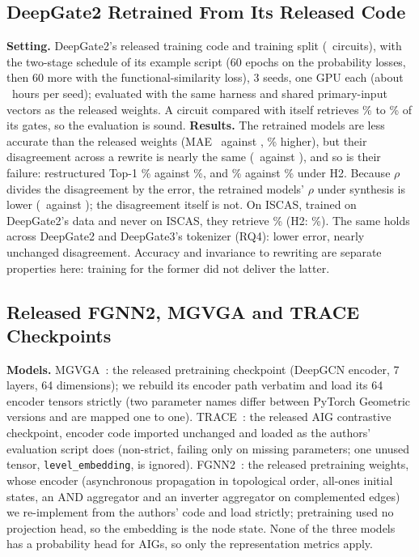 \subsection{DeepGate2 Retrained From Its Released Code}\label{app:dg2retrain}
\noindent\textbf{Setting.} DeepGate2's released training code and training split (\TenNTrain\ circuits), with the two-stage
schedule of its example script (60 epochs on the probability losses, then 60 more with the functional-similarity loss),
3 seeds, one GPU each (about \TenHours\ hours per seed); evaluated with the same harness and shared primary-input
vectors as the released weights. A circuit compared with itself retrieves \TenSelfMin\% to \TenSelfMax\% of its gates, so the
evaluation is sound. \textbf{Results.} The retrained models are less accurate than the released weights (MAE \TenMAE\ against
\TenRelMAE, \TenMaePct\% higher), but their disagreement across a rewrite is nearly the same (\TenIncons\ against \TenRelIncons),
and so is their failure: restructured Top-1 \TenTop\% against \TenRelTop\%, and \TenHTwo\% against \TenRelHTwo\% under H2. Because
$\rho$ divides the disagreement by the error, the retrained models' $\rho$ under synthesis is lower (\TenRho\ against \TenRelRho);
the disagreement itself is not. On ISCAS, trained on DeepGate2's data and never on ISCAS, they retrieve \TenIsTop\% (H2:
\TenIsHTwo\%). The same holds across DeepGate2 and DeepGate3's tokenizer (RQ4): lower error, nearly unchanged disagreement.
Accuracy and invariance to rewriting are separate properties here: training for the former did not deliver the latter.

\subsection{Released FGNN2, MGVGA and TRACE Checkpoints}\label{app:ext}
\noindent\textbf{Models.} MGVGA~\cite{DBLP:conf/iclr/WuZ0025}: the released pretraining checkpoint (DeepGCN encoder, 7 layers, 64
dimensions); we rebuild its encoder path verbatim and load its 64 encoder tensors strictly (two parameter names
differ between PyTorch Geometric versions and are mapped one to one). TRACE~\cite{DBLP:conf/dac/ZhengZZX26}: the released AIG
contrastive checkpoint, encoder code imported unchanged and loaded as the authors' evaluation script does
(non-strict, failing only on missing parameters; one unused tensor, \texttt{level\_embedding}, is ignored).
FGNN2~\cite{DBLP:journals/tcad/WangBHZXHHY25}: the released pretraining weights, whose encoder (asynchronous propagation in topological
order, all-ones initial states, an AND aggregator and an inverter aggregator on complemented edges) we
re-implement from the authors' code and load strictly; pretraining used no projection head, so the embedding is
the node state. None of the three models has a probability head for AIGs, so only the representation metrics apply.

